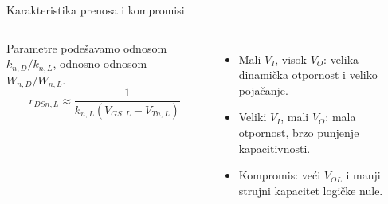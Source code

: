 \begin{frame}[label=09_1-s048]{Karakteristika prenosa i kompromisi}\setlength{\parskip}{2pt}\setlength{\abovedisplayskip}{4pt}\setlength{\belowdisplayskip}{4pt}\setlength{\abovedisplayshortskip}{3pt}\setlength{\belowdisplayshortskip}{3pt}
\begin{columns}[T,onlytextwidth]\centering {}Parametre podešavamo odnosom $k_{n,D}/k_{n,L}$, odnosno odnosom $W_{n,D}/W_{n,L}$.
\[r_{DSn,L}\approx\frac{1}{k_{n,L}(V_{GS,L}-V_{Tn,L})}\]
\begin{itemize}
\item Mali $V_I$, visok $V_O$: velika dinamička otpornost i veliko pojačanje.
\item Veliki $V_I$, mali $V_O$: mala otpornost, brzo punjenje kapacitivnosti.
\item Kompromis: veći $V_{OL}$ i manji strujni kapacitet logičke nule.
\end{itemize}\end{columns}
\end{frame}
